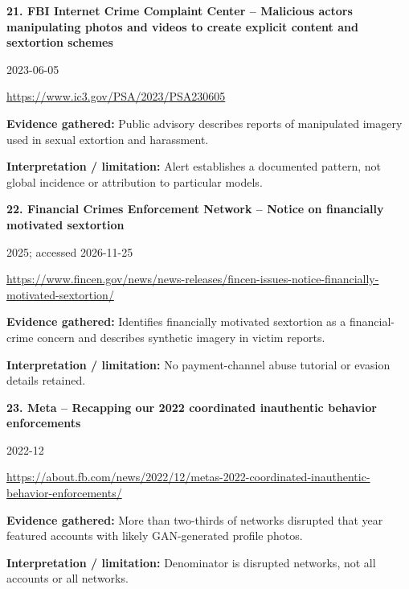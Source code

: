 \documentclass[11pt,a4paper]{article}
\begin{document}
\noindent\begin{minipage}{\linewidth}\textbf{21. FBI Internet Crime Complaint Center -- Malicious actors manipulating photos and videos to create explicit content and sextortion schemes}\par{\small 2023-06-05\par\url{https://www.ic3.gov/PSA/2023/PSA230605}}\par
\textbf{Evidence gathered:} Public advisory describes reports of manipulated imagery used in sexual extortion and harassment.\par\textbf{Interpretation / limitation:} Alert establishes a documented pattern, not global incidence or attribution to particular models.\par
\end{minipage}\par\vspace{2mm}
\noindent\begin{minipage}{\linewidth}\textbf{22. Financial Crimes Enforcement Network -- Notice on financially motivated sextortion}\par{\small 2025; accessed 2026-11-25\par\url{https://www.fincen.gov/news/news-releases/fincen-issues-notice-financially-motivated-sextortion/}}\par
\textbf{Evidence gathered:} Identifies financially motivated sextortion as a financial-crime concern and describes synthetic imagery in victim reports.\par\textbf{Interpretation / limitation:} No payment-channel abuse tutorial or evasion details retained.\par
\end{minipage}\par\vspace{2mm}
\noindent\begin{minipage}{\linewidth}\textbf{23. Meta -- Recapping our 2022 coordinated inauthentic behavior enforcements}\par{\small 2022-12\par\url{https://about.fb.com/news/2022/12/metas-2022-coordinated-inauthentic-behavior-enforcements/}}\par
\textbf{Evidence gathered:} More than two-thirds of networks disrupted that year featured accounts with likely GAN-generated profile photos.\par\textbf{Interpretation / limitation:} Denominator is disrupted networks, not all accounts or all networks.\par
\end{minipage}\par\vspace{2mm}
\end{document}
